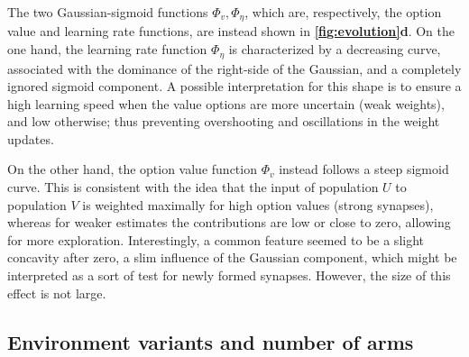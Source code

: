 The two Gaussian-sigmoid functions $\Phi_{v}, \Phi_{\eta}$, which are, respectively, the option value and learning rate functions, are instead shown in \textbf{\ref{fig:evolution}d}.
On the one hand, the learning rate function $\Phi_{\eta}$ is characterized by a decreasing curve, associated with the dominance of the right-side of the Gaussian, and a completely ignored sigmoid component.
A possible interpretation for this shape is to ensure a high learning speed when the value options are more uncertain (weak weights), and low otherwise; thus preventing overshooting and oscillations in the weight updates.

On the other hand, the option value function $\Phi_{v}$ instead follows a steep sigmoid curve.
This is consistent with the idea that the input of population $U$ to population $V$ is weighted maximally for high option values (strong synapses), whereas for weaker estimates the contributions are low or close to zero, allowing for more exploration.
Interestingly, a common feature seemed to be a slight concavity after zero, a slim influence of the Gaussian component, which might be interpreted as a sort of test for newly formed synapses. However, the size of this effect is not large.



\subsection{Environment variants and number of arms}

